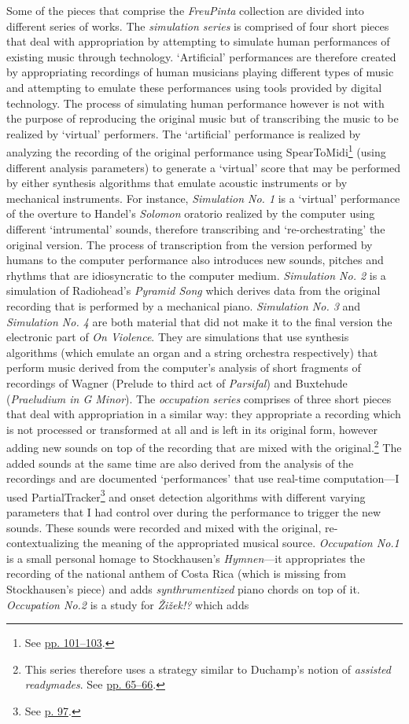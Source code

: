 Some of the pieces that comprise the \emph{FreuPinta} collection are divided into different series of works. The \emph{simulation series} is comprised of four short pieces that deal with appropriation by attempting to simulate human performances of existing music through technology. `Artificial' performances are therefore created by appropriating recordings of human musicians playing different types of music and attempting to emulate these performances using tools provided by digital technology. The process of simulating human performance however is not with the purpose of reproducing the original music but of transcribing the music to be realized by `virtual' performers. The `artificial' performance is realized by analyzing the recording of the original performance using SpearToMidi\footnote{See \hyperlink{spearmidi}{pp. 101--103}.} (using different analysis parameters) to generate a `virtual' score that may be performed by either synthesis algorithms that emulate acoustic instruments or by mechanical instruments. For instance, \emph{Simulation No. 1} is a `virtual' performance of the overture to Handel's \emph{Solomon} oratorio realized by the computer using different `intrumental' sounds, therefore transcribing and `re-orchestrating' the original version. The process of transcription from the version performed by humans to the computer performance also introduces new sounds, pitches and rhythms that are idiosyncratic to the computer medium. \emph{Simulation No. 2} is a simulation of Radiohead's \emph{Pyramid Song} which derives data from the original recording that is performed by a mechanical piano. \emph{Simulation No. 3} and \emph{Simulation No. 4} are both material that did not make it to the final version the electronic part of \emph{On Violence}. They are simulations that use synthesis algorithms (which emulate an organ and a string orchestra respectively) that perform music derived from the computer's analysis of short fragments of recordings of Wagner (Prelude to third act of \emph{Parsifal}) and Buxtehude (\emph{Praeludium in G Minor}). The \emph{occupation series} comprises of three short pieces that deal with appropriation in a similar way: they appropriate a recording which is not processed or transformed at all and is left in its original form, however adding new sounds on top of the recording that are mixed with the original.\footnote{This series therefore uses a strategy similar to Duchamp's notion of \emph{assisted readymades}. See \hyperlink{lhooq}{pp. 65--66}.} The added sounds at the same time are also derived from the analysis of the recordings and are documented `performances' that use real-time computation---I used PartialTracker\footnote{See \hyperlink{partrack}{p. 97}.} and onset detection algorithms with different varying parameters that I had control over during the performance to trigger the new sounds. These sounds were recorded and mixed with the original, re-contextualizing the meaning of the appropriated musical source. \emph{Occupation No.1} is a small personal homage to Stockhausen's \emph{Hymnen}---it appropriates the recording of the national anthem of Costa Rica (which is missing from Stockhausen's piece) and adds \emph{synthrumentized} piano chords on top of it. \emph{Occupation No.2} is a study for \emph{\v{Z}i\v{z}ek!?} which adds 